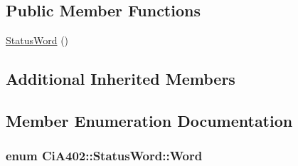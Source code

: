 \subsection*{Public Member Functions}
\begin{DoxyCompactItemize}
\item 
\hyperlink{struct_ci_a402_1_1_status_word_a91e826e328dba026fe074dc84fc67aea}{Status\-Word} ()
\end{DoxyCompactItemize}
\subsection*{Additional Inherited Members}


\subsection{Member Enumeration Documentation}
\hypertarget{struct_ci_a402_1_1_status_word_a9f47eab9ccb339144eb9c5848109b3e7}{
\subsubsection[{Word}]{\setlength{\rightskip}{0pt plus 5cm}enum {\bf Ci\-A402\-::\-Status\-Word\-::\-Word}}}\label{struct_ci_a402_1_1_status_word_a9f47eab9ccb339144eb9c5848109b3e7}

